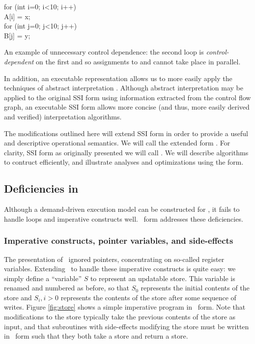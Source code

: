 \documentclass[12pt,titlepage,twoside]{article}
\begin{document}
\begin{myfigure}[t]
\begin{samplecode}
for (int i=0; i<10; i++)\\
\>A[i] = x;\\
for (int j=0; j<10; j++)\\
\>B[j] = y;\\
\end{samplecode}
\caption[An example of unnecessary control dependence.]
{An example of unnecessary control dependence: the second loop
is \emph{control-dependent} on the first and so assignments to
 and  cannot take place in parallel.}
\label{fig:ctrldep}
\end{myfigure}

In addition, an executable representation allows us to more easily
apply the techniques of abstract interpretation \cite{pingali90:dfg}.
Although abstract interpretation may be applied to the original SSI
form using information extracted from the control flow graph, an
executable SSI form allows more concise (and thus, more easily derived
and verified) interpretation algorithms.

The modifications outlined here will extend SSI form in order to
provide a useful and descriptive operational semantics.  We will call
the extended form \ssiplus.  For clarity, SSI form as originally
presented we will call \ssizero.  We will describe algorithms to
contruct \ssiplus{} efficiently, and illustrate analyses and
optimizations using the form.

\subsection{Deficiencies in \ssizero}
Although a demand-driven execution model can be constructed for
\ssizero,  it fails to handle loops and imperative
constructs well. \ssiplus\ form addresses these deficiencies.

\subsubsection{Imperative constructs, pointer variables, and side-effects}
The presentation of \ssizero\ ignored pointers,
concentrating on so-called register variables.  Extending \ssizero\ to
handle these imperative constructs is quite easy: we simply define a
``variable'' $S$ to represent an updatable store.  This variable is
renamed and numbered as before, so that $S_0$ represents the initial
contents of the store and $S_i, i>0$ represents the contents of the
store after some sequence of writes.  Figure \ref{fig:store} shows a
simple imperative program in \ssiplus\ form.  Note that modifications
to the store typically take the previous contents of the store as
input, and that subroutines with side-effects modifying the store must
be written in \ssiplus\ form such that they both take a store and
return a store.
\end{document}
